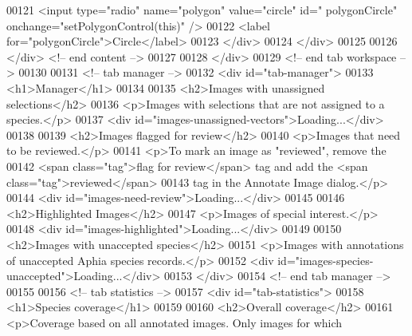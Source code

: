 \begin{DoxyCode}
00121                         <input type=\textcolor{stringliteral}{"radio"} name=\textcolor{stringliteral}{"polygon"} value=\textcolor{stringliteral}{"circle"} \textcolor{keywordtype}{id}=\textcolor{stringliteral}{"
      polygonCircle"} onchange=\textcolor{stringliteral}{"setPolygonControl(this)"} />
00122                         <label \textcolor{keywordflow}{for}=\textcolor{stringliteral}{"polygonCircle"}>Circle</label>
00123                     </div>
00124                 </div>
00125 
00126             </div> <!-- end content -->
00127 
00128         </div>
00129         <!-- end tab workspace -->
00130 
00131         <!-- tab manager -->
00132         <div \textcolor{keywordtype}{id}=\textcolor{stringliteral}{"tab-manager"}>
00133             <h1>Manager</h1>
00134 
00135             <h2>Images with unassigned selections</h2>
00136             <p>Images with selections that are not assigned to a species.</p>
00137             <div \textcolor{keywordtype}{id}=\textcolor{stringliteral}{"images-unassigned-vectors"}>Loading...</div>
00138 
00139             <h2>Images flagged \textcolor{keywordflow}{for} review</h2>
00140             <p>Images that need to be reviewed.</p>
00141             <p>To mark an image as \textcolor{stringliteral}{"reviewed"}, \textcolor{keyword}{remove} the
00142             <span \textcolor{keyword}{class}=\textcolor{stringliteral}{"tag"}>flag \textcolor{keywordflow}{for} review</span> tag and add the <span \textcolor{keyword}{
      class}=\textcolor{stringliteral}{"tag"}>reviewed</span>
00143             tag in the Annotate Image dialog.</p>
00144             <div \textcolor{keywordtype}{id}=\textcolor{stringliteral}{"images-need-review"}>Loading...</div>
00145 
00146             <h2>Highlighted Images</h2>
00147             <p>Images of special interest.</p>
00148             <div \textcolor{keywordtype}{id}=\textcolor{stringliteral}{"images-highlighted"}>Loading...</div>
00149 
00150             <h2>Images with unaccepted species</h2>
00151             <p>Images with annotations of unaccepted Aphia species records.</p>
00152             <div \textcolor{keywordtype}{id}=\textcolor{stringliteral}{"images-species-unaccepted"}>Loading...</div>
00153         </div>
00154         <!-- end tab manager -->
00155 
00156         <!-- tab statistics -->
00157         <div \textcolor{keywordtype}{id}=\textcolor{stringliteral}{"tab-statistics"}>
00158             <h1>Species coverage</h1>
00159 
00160             <h2>Overall coverage</h2>
00161             <p>Coverage based on all annotated images. Only images \textcolor{keywordflow}{for} which

\end{DoxyCode}
